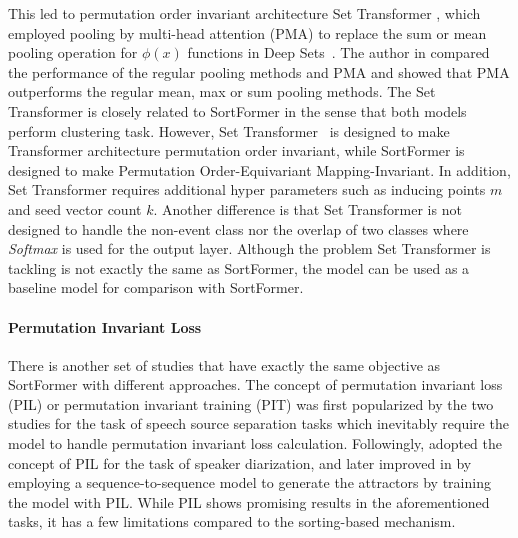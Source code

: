 \documentclass{article}
\begin{document}
This led to permutation order invariant architecture Set Transformer \cite{lee2019set}, which employed pooling by multi-head attention (PMA)
to replace the sum or mean pooling operation for $\phi(x)$ functions in Deep Sets~\cite{zaheer2017deep}.
The author in \cite{lee2019set} compared the performance of the regular pooling methods and PMA and showed that PMA outperforms the regular mean, max or sum pooling methods.
The Set Transformer is closely related to SortFormer in the sense that both models perform clustering task.
However, Set Transformer~\cite{lee2019set} is designed to make Transformer architecture permutation order invariant, while SortFormer is designed to make Permutation Order-Equivariant Mapping-Invariant.
In addition, Set Transformer requires additional hyper parameters such as inducing points $m$ and seed vector count $k$.
Another difference is that Set Transformer is not designed to handle the non-event class nor the overlap of two classes where \textit{Softmax} is used for the output layer.
Although the problem Set Transformer is tackling is not exactly the same as SortFormer, the model can be used as a baseline model for comparison with SortFormer.

\paragraph{Permutation Invariant Loss}

There is another set of studies that have exactly the same objective as SortFormer with different approaches.
The concept of permutation invariant loss (PIL) or permutation invariant training (PIT) was first popularized by the two studies \cite{kolbaek2017multitalker, yu2017permutation}
for the task of speech source separation tasks which inevitably require the model to handle permutation invariant loss calculation.
Followingly, \cite{fujita2019end} adopted the concept of PIL for the task of speaker diarization, and later improved in \cite{horiguchi2022encoder} by
employing a sequence-to-sequence model to generate the attractors by training the model with PIL. While PIL shows promising results in the aforementioned tasks,
it has a few limitations compared to the sorting-based mechanism.
\end{document}

